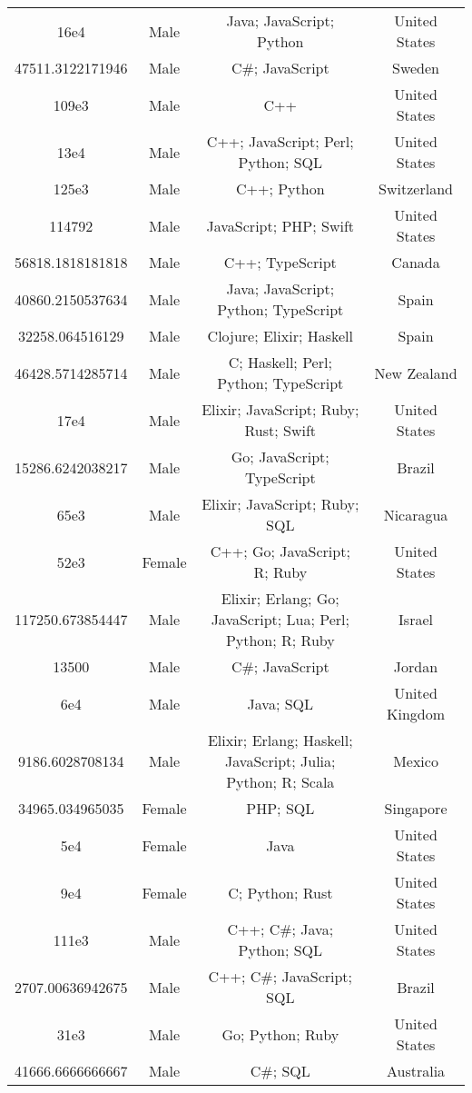 \begin{center}
\begin{tabular}{ |c|c|c|c| }
16e4  &  Male  &  Java; JavaScript; Python  &  United States  \\ 
47511.3122171946  &  Male  &  C\#; JavaScript  &  Sweden  \\ 
109e3  &  Male  &  C++  &  United States  \\ 
13e4  &  Male  &  C++; JavaScript; Perl; Python; SQL  &  United States  \\ 
125e3  &  Male  &  C++; Python  &  Switzerland  \\ 
114792  &  Male  &  JavaScript; PHP; Swift  &  United States  \\ 
56818.1818181818  &  Male  &  C++; TypeScript  &  Canada  \\ 
40860.2150537634  &  Male  &  Java; JavaScript; Python; TypeScript  &  Spain  \\ 
32258.064516129  &  Male  &  Clojure; Elixir; Haskell  &  Spain  \\ 
46428.5714285714  &  Male  &  C; Haskell; Perl; Python; TypeScript  &  New Zealand  \\ 
17e4  &  Male  &  Elixir; JavaScript; Ruby; Rust; Swift  &  United States  \\ 
15286.6242038217  &  Male  &  Go; JavaScript; TypeScript  &  Brazil  \\ 
65e3  &  Male  &  Elixir; JavaScript; Ruby; SQL  &  Nicaragua  \\ 
52e3  &  Female  &  C++; Go; JavaScript; R; Ruby  &  United States  \\ 
117250.673854447  &  Male  &  Elixir; Erlang; Go; JavaScript; Lua; Perl; Python; R; Ruby  &  Israel  \\ 
13500  &  Male  &  C\#; JavaScript  &  Jordan  \\ 
6e4  &  Male  &  Java; SQL  &  United Kingdom  \\ 
9186.6028708134  &  Male  &  Elixir; Erlang; Haskell; JavaScript; Julia; Python; R; Scala  &  Mexico  \\ 
34965.034965035  &  Female  &  PHP; SQL  &  Singapore  \\ 
5e4  &  Female  &  Java  &  United States  \\ 
9e4  &  Female  &  C; Python; Rust  &  United States  \\ 
111e3  &  Male  &  C++; C\#; Java; Python; SQL  &  United States  \\ 
2707.00636942675  &  Male  &  C++; C\#; JavaScript; SQL  &  Brazil  \\ 
31e3  &  Male  &  Go; Python; Ruby  &  United States  \\ 
41666.6666666667  &  Male  &  C\#; SQL  &  Australia  \\ 

\end{tabular}
\end{center}
